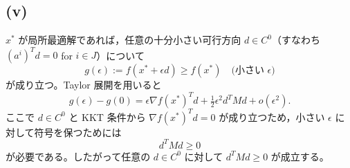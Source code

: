 \documentclass[12pt,a4paper]{article}
\begin{document}
\subsection*{(v)}
$x^*$ が局所最適解であれば，任意の十分小さい可行方向 $d\in C^0$（すなわち $(a^i)^T d=0$ for $i\in J$）について
\[g(\epsilon):=f(x^*+\epsilon d)\ge f(x^*)\quad\text{(小さい }\epsilon\text{)}\]
が成り立つ。Taylor 展開を用いると
\[
g(\epsilon)-g(0) = \epsilon\nabla f(x^*)^T d + \tfrac12\epsilon^2 d^T M d + o(\epsilon^2).
\]
ここで $d\in C^0$ と KKT 条件から $\nabla f(x^*)^T d=0$ が成り立つため，小さい $\epsilon$ に対して符号を保つためには
\[d^T M d \ge 0
\]
が必要である。したがって任意の $d\in C^0$ に対して $d^T M d\ge0$ が成立する。
\end{document}
